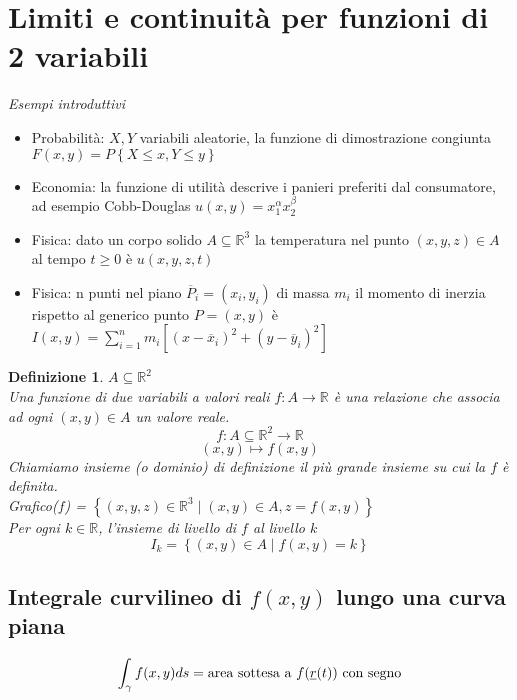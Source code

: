\documentclass{scrreprt}
\newtheorem{defn}{Definizione}
\newenvironment{definition}{\begin{mdframed}[backgroundcolor=Ivory2]\begin{defn}}{\end{defn}\end{mdframed}}
\begin{document}
\section{Limiti e continuità per funzioni di 2 variabili}
\emph{Esempi introduttivi}
\begin{itemize}
	\item Probabilità: $X, Y$ variabili aleatorie, la funzione di dimostrazione congiunta $F(x,y)=P\left\{X\leq x, Y\leq y\right\} $
	\item Economia: la funzione di utilità descrive i panieri preferiti dal consumatore, ad esempio Cobb-Douglas $u(x,y)=x_1^{\alpha}x_2^{\beta}$
	\item Fisica: dato un corpo solido $A \subseteq \mathbb{R}^3$ la temperatura nel punto $(x,y,z) \in A$ al tempo $t \geq 0$ è  $u(x,y,z,t)$
	\item Fisica: n punti nel piano $\overline{P}_i = (x_i, y_i)$ di massa $m_i$ il momento di inerzia rispetto al generico punto $P=(x,y)$ è $I(x,y) = \sum_{i=1}^n m_i \left[(x-\overline{x}_i)^2+(y-\overline{y}_i)^2\right]$
\end{itemize}

\begin{definition}
	$A \subseteq \mathbb{R}^2$\\
	Una funzione di due variabili a valori reali $f: A \rightarrow \mathbb{R}$ è una relazione che associa ad ogni $(x,y) \in A$ un valore reale.
	\begin{equation}
		f: A \subseteq \mathbb{R}^2 \rightarrow \mathbb{R}
	\end{equation}
	\begin{equation}
		(x,y) \mapsto f(x,y)
	\end{equation}
	Chiamiamo insieme (o dominio) di definizione il più grande insieme su cui la $f$ è definita.\\

	\noindent Grafico($f$) = $\left\{(x,y,z) \in \mathbb{R}^3 \mid (x,y) \in A, z=f(x,y)\right\}$\\

	\noindent Per ogni $k \in \mathbb{R}$, l'insieme di livello di $f$ al livello $k$
	\begin{equation}
		I_k = \left\{(x,y) \in A \mid f(x,y)=k\right\}
	\end{equation}
\end{definition}

\subsection*{Integrale curvilineo di $f(x,y)$ lungo una curva piana} %
\begin{equation}
	\int_{\gamma} f(x,y) ds = \textnormal{area sottesa a $f(\underline{r}(t))$ con segno}
\end{equation}
\end{document}
